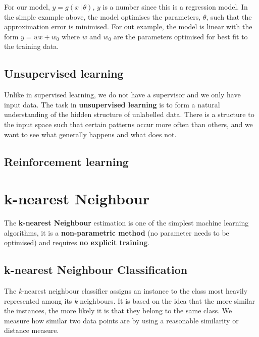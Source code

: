 \documentclass[11pt,fleqn]{book} %
\begin{document}
\noindent
For our model, $y = g(x \, \vert \, \theta)$, $y$ is a number since this is a regression model. In the simple example above, the model optimises the parameters, $\theta$, such that the approximation error is minimised. For out example, the model is linear with the form $y = wx+w_0$ where $w$ and $w_0$ are the parameters optimised for best fit to the training data.

\section{Unsupervised learning}
Unlike in supervised learning, we do not have a supervisor and we only have input data. The task in \textbf{unsupervised learning} is to form a natural understanding of the hidden structure of unlabelled data. There is a structure to the input space such that certain patterns occur more often than others, and we want to see what generally happens and what does not.

\section{Reinforcement learning}



\chapter{k-nearest Neighbour}
The \textbf{k-nearest Neighbour} estimation is one of the simplest machine learning algorithms, it is a \textbf{non-parametric method} (no parameter needs to be optimised) and requires \textbf{no explicit training}.

\section{k-nearest Neighbour Classification}
The \textit{k}-nearest neighbour classifier assigns an instance to the class most heavily represented among its \textit{k} neighbours. It is based on the idea that the more similar the instances, the more likely it is that they belong to the same class. We measure how similar two data points are by using a reasonable similarity or distance measure.
\end{document}
